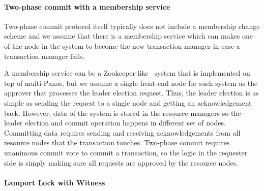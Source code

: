 

\paragraph{Two-phase commit with a membership service}
Two-phase commit protocol itself typically does not include a membership
change scheme and we assume that there is a membership service which can makes one of the
node in the system to become the new transaction manager in case a transaction 
manager fails. 

A membership service can be a Zookeeper-like~\cite{zookeeper} system that is implemented on top
of multi-Paxos, but we assume a single front-end node for such system as the
approver that processes the leader election request. Thus, the leader election is 
as simple as sending the request to a single node and getting an acknowledgement back. 
However, data of the system is stored in the resource managers so the leader election and
commit operation happens in different set of nodes. Committing data requires sending
and receiving acknowledgements from all resource nodes that the transaction
touches.  Two-phase commit requires unanimous commit vote to commit a transaction, so the
logic in the requester side is simply making sure all requests are approved by
the resource nodes. 

\paragraph{Lamport Lock with Witness}

